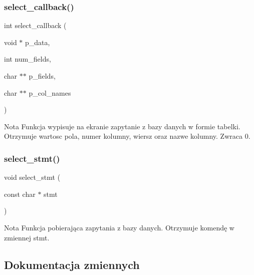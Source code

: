 \subsubsection{select\_callback()}
{\footnotesize\ttfamily int select\+\_\+callback (\begin{DoxyParamCaption}\item[{void $\ast$}]{p\+\_\+data,  }\item[{int}]{num\+\_\+fields,  }\item[{char $\ast$$\ast$}]{p\+\_\+fields,  }\item[{char $\ast$$\ast$}]{p\+\_\+col\+\_\+names }\end{DoxyParamCaption})}


\begin{DoxyCode}{0}
\end{DoxyCode}
 \begin{DoxyNote}{Nota}
Funkcja wypisuje na ekranie zapytanie z bazy danych w formie tabelki. Otrzymuje wartosc pola, numer kolumny, wiersz oraz nazwe kolumny. Zwraca 0. 
\end{DoxyNote}
\mbox{\label{client__management_8cpp_acb1b61327008939be528a930f06fa74b}} 
\subsubsection{select\_stmt()}
{\footnotesize\ttfamily void select\+\_\+stmt (\begin{DoxyParamCaption}\item[{const char $\ast$}]{stmt }\end{DoxyParamCaption})}


\begin{DoxyCode}{0}
\end{DoxyCode}
 \begin{DoxyNote}{Nota}
Funkcja pobierająca zapytania z bazy danych. Otrzymuje komendę w zmiennej stmt. 
\end{DoxyNote}


\subsection{Dokumentacja zmiennych}
\mbox{\label{client__management_8cpp_adebdc4897ddde9329dd87b51840d7ec7}} 
